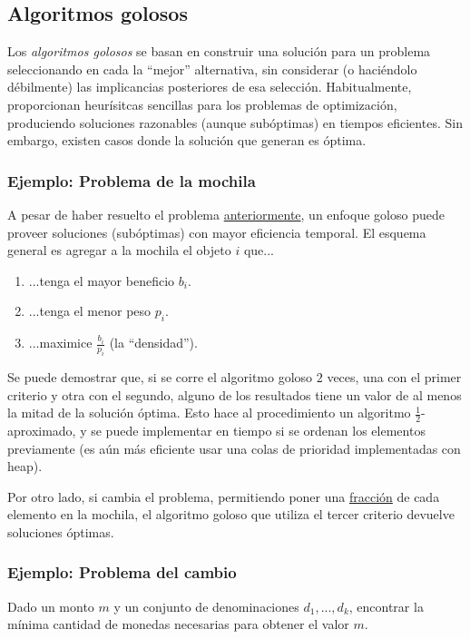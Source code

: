 \subsection{Algoritmos golosos}

Los \textit{algoritmos golosos} se basan en construir una solución para un problema seleccionando en cada la ``mejor'' alternativa, sin considerar (o haciéndolo débilmente) las implicancias posteriores de esa selección. Habitualmente, proporcionan heurísitcas sencillas para los problemas de optimización, produciendo soluciones razonables (aunque subóptimas) en tiempos eficientes. Sin embargo, existen casos donde la solución que generan es óptima.

\subsubsection{Ejemplo: Problema de la mochila}

A pesar de haber resuelto el problema \hyperref[problema-mochila]{anteriormente}, un enfoque goloso puede proveer soluciones (subóptimas) con mayor eficiencia temporal. El esquema general es agregar a la mochila el objeto $i$ que...
\begin{enumerate}
    \item ...tenga el mayor beneficio $b_i$.
    \item ...tenga el menor peso $p_i$.
    \item ...maximice $\frac{b_i}{p_i}$ (la ``densidad'').
\end{enumerate}

Se puede demostrar que, si se corre el algoritmo goloso $2$ veces, una con el primer criterio y otra con el segundo, alguno de los resultados tiene un valor de al menos la mitad de la solución óptima. Esto hace al procedimiento un algoritmo $\frac{1}{2}$-aproximado, y se puede implementar en tiempo si se ordenan los elementos previamente (es aún más eficiente usar una colas de prioridad implementadas con heap).

Por otro lado, si cambia el problema, permitiendo poner una \underline{fracción} de cada elemento en la mochila, el algoritmo goloso que utiliza el tercer criterio devuelve soluciones óptimas.

\subsubsection{Ejemplo: Problema del cambio}

\begin{problema}
    Dado un monto $m$ y un conjunto de denominaciones $d_1, ..., d_k$, encontrar la mínima cantidad de monedas necesarias para obtener el valor $m$.
\end{problema}

